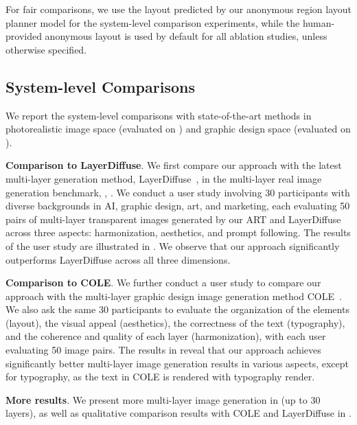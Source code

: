 For fair comparisons, we use the layout predicted by our anonymous region layout planner model for the system-level comparison experiments, while the human-provided anonymous layout is used by default for all ablation studies, unless otherwise specified.


\subsection{System-level Comparisons}\label{exp:system_level}

We report the system-level comparisons with state-of-the-art methods in photorealistic image space (evaluated on \photobenchmark) and graphic design space (evaluated on \designbenchmark). 

\vspace{1mm}
\noindent\textbf{Comparison to LayerDiffuse}. We first compare our approach with the latest multi-layer generation method, LayerDiffuse~\cite{zhang2024transparent}, in the multi-layer real image generation benchmark, \ie, \photobenchmark. We conduct a user study involving 30 participants with diverse backgrounds in AI, graphic design, art, and marketing, each evaluating 50 pairs of multi-layer transparent images generated by our ART and LayerDiffuse across three aspects: harmonization, aesthetics, and prompt following.
The results of the user study are illustrated in . We observe that our approach significantly outperforms LayerDiffuse across all three dimensions.

\vspace{1mm}
\noindent\textbf{Comparison to COLE}. We further conduct a user study to compare our approach with the multi-layer graphic design image generation method COLE~\cite{jia2023cole}. We also ask the same 30 participants to evaluate the organization of the elements (layout), the visual appeal (aesthetics), the correctness of the text (typography), and the coherence and quality of each layer (harmonization), with each user evaluating 50 image pairs. The results in  reveal that our approach achieves significantly better multi-layer image generation results in various aspects, except for typography, as the text in COLE is rendered with typography render.

\noindent\textbf{More results}. 
We present more multi-layer image generation in  (up to 30 layers), as well as qualitative comparison results with COLE and LayerDiffuse in .


